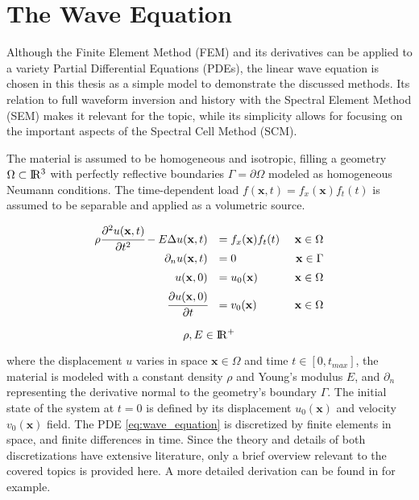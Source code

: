 %
\section{The Wave Equation}
\label{section:wave_equation}
%

Although the Finite Element Method (FEM) and its derivatives can be applied to a variety Partial Differential Equations (PDEs), the linear wave equation is chosen in this thesis as a simple model to demonstrate the discussed methods.
Its relation to full waveform inversion \cite{Zhang2013} and history with the Spectral Element Method (SEM) \cite{Maggio1994} makes it relevant for the topic, while its simplicity allows for focusing on the important aspects of the Spectral Cell Method (SCM).

The material is assumed to be homogeneous and isotropic, filling a geometry $\Omega \subset \rm I\!R^3$ with perfectly reflective boundaries $\Gamma = \partial \Omega$ modeled as homogeneous Neumann conditions. The time-dependent load $f(\mathbf x, t)=f_x(\mathbf x)f_t(t)$ is assumed to be separable and applied as a volumetric source.

\begin{equation} \label{eq:wave_equation}
	\begin{array}{rlr}
		\rho \cfrac{\partial^2 u(\mathbf x,t)}{\partial t^2} - E \Delta u(\mathbf x, t) &= f_x(\mathbf x) f_t(t)
		& \ \mathbf x \in \Omega \\[0.5em]
		\partial_n u(\mathbf x, t) &= 0
		& \mathbf x \in \Gamma \\[0.5em]
		u(\mathbf x, 0) &= u_0(\mathbf x)
		& \ \mathbf x \in \Omega \\[0.5em]
		\cfrac{\partial u(\mathbf x, 0)}{\partial t} &= v_0(\mathbf x)
		& \ \mathbf x \in \Omega \\
	\end{array}
\end{equation}

\begin{equation}
	\rho, E \in \rm I\!R^+
\end{equation}

where the displacement $u$ varies in space $\mathbf x \in \Omega$ and time $t \in [0,t_{max}]$, the material is modeled with a constant density $\rho$ and Young's modulus $E$, and $\partial_n$ representing the derivative normal to the geometry's boundary $\Gamma$. The initial state of the system at $t=0$ is defined by its displacement $u_0(\mathbf x)$ and velocity $v_0(\mathbf x)$ field.
The PDE \ref{eq:wave_equation} is discretized by finite elements in space, and finite differences in time. Since the theory and details of both discretizations have extensive literature, only a brief overview relevant to the covered topics is provided here. A more detailed derivation can be found in \cite{Larson2013} for example.

